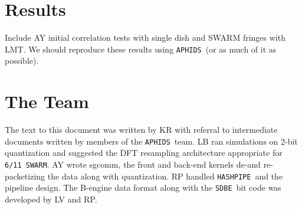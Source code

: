 \documentclass[11pt,preprint]{aastex}
\newcommand{\SWARM}[1]{\texttt{#1\,SWARM}}
\newcommand{\SDBE}{\texttt{SDBE}}
\newcommand{\APHIDS}{\texttt{APHIDS}}
\newcommand{\HASHPIPE}{\texttt{HASHPIPE}}
\begin{document}
\section{Results}

Include AY initial correlation tests with single dish and SWARM fringes with LMT.
We should reproduce these results using \APHIDS\ (or as much of it as possible).

\section{The Team}
The text to this document was written by KR with referral to intermediate documents written by
members of the \APHIDS\ team.  LB ran simulations on 2-bit quantization and suggested the DFT resampling 
architecture appropriate for \SWARM{6/11}. AY wrote sgcomm, the front and back-end kernels de-and re-packetizing 
the data along with quantization. RP handled \HASHPIPE\, and the pipeline design.  The B-engine data format along 
with the \SDBE\, bit code was developed by LV and RP.

\acknowledgments 
\clearpage


\end{document}

